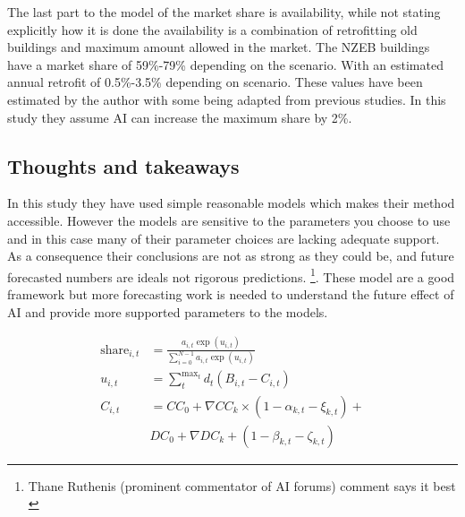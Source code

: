 \documentclass[conference,a4paper]{IEEEtran}
\begin{document}
The last part to the model of the market share is availability, while not stating explicitly how it is done the availability is a combination of retrofitting old buildings and maximum amount allowed in the market. The NZEB buildings have a market share of 59\%-79\% depending on the scenario. With an estimated annual retrofit of 0.5\%-3.5\% depending on scenario. These values have been estimated by the author with some being adapted from previous studies. In this study they assume AI can increase the maximum share by 2\%.

\subsection*{Thoughts and takeaways}
In this study they have used simple reasonable models which makes their method accessible. However the models are sensitive to the parameters you choose to use and in this case many of their parameter choices are lacking adequate support. As a consequence their conclusions are not as strong as they could be, and future forecasted numbers are ideals not rigorous predictions. \footnote{Thane Ruthenis (prominent commentator of AI forums) comment says it best \cite{ruthenisDeepCritiqueAI2025}}. These model are a good framework but more forecasting work is needed to understand the future effect of AI and provide more supported parameters to the models.


\begin{align}
  \text{share}_{i,t} &= \frac{a_{i,t}\exp{(u_{i,t})}}{\sum_{i=0}^{N-1}a_{i,t}\exp{(u_{i,t})}}\label{eq:share} \\
  u_{i,t} &= \sum_{t}^{\text{max}_t}d_t(B_{i,t}-C_{i,t}) \label{eq:utility}\\
  C_{i,t} &= CC_0+ \nabla CC_k\times(1-\alpha_{k,t}-\xi_{k,t}) +\nonumber\\& DC_0+\nabla DC_k+(1-\beta_{k,t}-\zeta_{k,t}) \label{eq:cost}
\end{align}




\appendix
\end{document}
